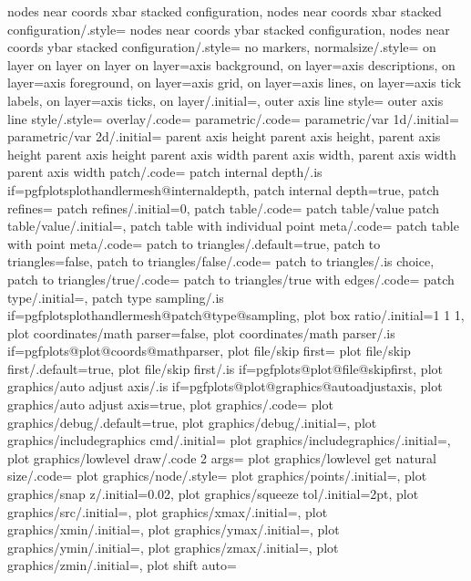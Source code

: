 {{{{{{{{{{{{{{{{{{{{{{{{{{{{{{{{{{{{{{{{{{{{{{{{{{{{{{{{{{{{{{{{{{{{{{{{{{{{{{{{{{{{{{{{{{{{{{{{{{{{{{{{{{{{{{{{{{{{{{{{{{{{{{{{{{{{{{{{{{{{{{{{{{{{{{{{{{{{{{{{{{{{{{{{{{{{{{{{{{{{{{{{{{{{{{{{{{{{{{{{{{{{{{{{{{{{{{{{{{{{{{{{{{{{{{{{{{{{{{{{{{{{{{{{{{{{{{{{{{{{{{{{{{{{{{{{{{{{{{{{{{{{{{{{{{{{{{{{{{{{{{{{{{{{{{{{{{{{{{{{{{{{{{{{{{{{{{{{{{{{{{{{{{{{{{{{{{{{{{{{{{{{{{{{{{{{{{{{{{{{{{{{{{{{{{{{{{{{{{{{{{{{{{{{{{{{{{{{{{{{{{{{{{{{{{{{{{{{{{{{{{{{{{{{{{{{{{{{{{{{{{{{{{{{{{{{{{{{{{{{{{{{{{{{{{{{{{{{{{{{{{{{{{{{{{{{nodes near coords xbar stacked configuration,
nodes near coords xbar stacked configuration/.style={
nodes near coords ybar stacked configuration,
nodes near coords ybar stacked configuration/.style={
no markers,
normalsize/.style={
on layer
on layer{
on layer}
on layer=axis background,
on layer=axis descriptions,
on layer=axis foreground,
on layer=axis grid,
on layer=axis lines,
on layer=axis tick labels,
on layer=axis ticks,
on layer/.initial=,
outer axis line style={
outer axis line style/.style={
overlay/.code={
parametric/.code={
parametric/var 1d/.initial=
parametric/var 2d/.initial={
parent axis height
parent axis height,
parent axis height{
parent axis height}}
parent axis width
parent axis width,
parent axis width{
parent axis width}}
patch/.code={
patch internal depth/.is if=pgfplotsplothandlermesh@internaldepth,
patch internal depth=true,
patch refines={
patch refines/.initial=0,
patch table/.code={
patch table/value{
patch table/value/.initial=,
patch table with individual point meta/.code={
patch table with point meta/.code={
patch to triangles/.default=true,
patch to triangles=false,
patch to triangles/false/.code=			{
patch to triangles/.is choice,
patch to triangles/true/.code=			{
patch to triangles/true with edges/.code=	{
patch type/.initial=,
patch type sampling/.is if=pgfplotsplothandlermesh@patch@type@sampling,
plot box ratio/.initial=1 1 1,
plot coordinates/math parser=false,
plot coordinates/math parser/.is if=pgfplots@plot@coords@mathparser,
plot file/skip first={
plot file/skip first/.default=true,
plot file/skip first/.is if=pgfplots@plot@file@skipfirst,
plot graphics/auto adjust axis/.is if=pgfplots@plot@graphics@autoadjustaxis,
plot graphics/auto adjust axis=true,
plot graphics/.code={
plot graphics/debug/.default=true,
plot graphics/debug/.initial=,
plot graphics/includegraphics cmd/.initial=
plot graphics/includegraphics/.initial=,
plot graphics/lowlevel draw/.code 2 args={
plot graphics/lowlevel get natural size/.code={
plot graphics/node/.style={
plot graphics/points/.initial=,
plot graphics/snap z/.initial=0.02,
plot graphics/squeeze tol/.initial=2pt,
plot graphics/src/.initial=,
plot graphics/xmax/.initial=,
plot graphics/xmin/.initial=,
plot graphics/ymax/.initial=,
plot graphics/ymin/.initial=,
plot graphics/zmax/.initial=,
plot graphics/zmin/.initial=,
plot shift auto={
}}}}}}}}}}}}}}}}}}}}}}}}}}}}}}}}}}}}}}}}}}}}}}}}}}}}}}}}}}}}}}}}}}}}}}}}}}}}}}}}}}}}}}}}}}}}}}}}}}}}}}}}}}}}}}}}}}}}}}}}}}}}}}}}}}}}}}}}}}}}}}}}}}}}}}}}}}}}}}}}}}}}}}}}}}}}}}}}}}}}}}}}}}}}}}}}}}}}}}}}}}}}}}}}}}}}}}}}}}}}}}}}}}}}}}}}}}}}}}}}}}}}}}}}}}}}}}}}}}}}}}}}}}}}}}}}}}}}}}}}}}}}}}}}}}}}}}}}}}}}}}}}}}}}}}}}}}}}}}}}}}}}}}}}}}}}}}}}}}}}}}}}}}}}}}}}}}}}}}}}}}}}}}}}}}}}}}}}}}}}}}}}}}}}}}}}}}}}}}}}}}}}}}}}}}}}}}}}}}}}}}}}}}}}}}}}}}}}}}}}}}}}}}}}}}}}}}}}}}}}}}}}}}}}}}}}}}}}}}}}}}}}}}}}}}}}}}}}}}}}}}}}}}}}}}}}}}}}}}}}}}}}}}}}}}}}}
